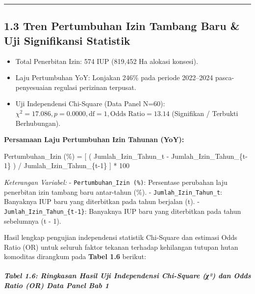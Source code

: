 \documentclass[
]{article}
\newenvironment{Shaded}{}{}
\newcommand{\NormalTok}[1]{#1}
\providecommand{\tightlist}{%
  \setlength{\itemsep}{0pt}\setlength{\parskip}{0pt}}
\begin{document}
\begin{center}\rule{0.5\linewidth}{0.5pt}\end{center}

\subsection{1.3 Tren Pertumbuhan Izin Tambang Baru \& Uji Signifikansi
Statistik}\label{tren-pertumbuhan-izin-tambang-baru-uji-signifikansi-statistik}

\begin{itemize}
\tightlist
\item
  Total Penerbitan Izin: 574 IUP (819,452 Ha alokasi konsesi).
\item
  Laju Pertumbuhan YoY: Lonjakan 246\% pada periode 2022--2024
  pasca-penyesuaian regulasi perizinan terpusat.
\item
  Uji Independensi Chi-Square (Data Panel N=60):
  \(\chi^2 = 17.086, p = 0.0000, \text{df} = 1, \text{Odds Ratio} = 13.14\)
  (Signifikan / Terbukti Berhubungan).
\end{itemize}

\textbf{Persamaan Laju Pertumbuhan Izin Tahunan (YoY):}

\begin{Shaded}
\begin{Highlighting}[]
\NormalTok{Pertumbuhan\_Izin (\%) = [ ( Jumlah\_Izin\_Tahun\_t {-} Jumlah\_Izin\_Tahun\_\{t{-}1\} ) / Jumlah\_Izin\_Tahun\_\{t{-}1\} ] * 100}
\end{Highlighting}
\end{Shaded}

\emph{Keterangan Variabel:} - \texttt{Pertumbuhan\_Izin\ (\%)}:
Persentase perubahan laju penerbitan izin tambang baru antar-tahun (\%).
- \texttt{Jumlah\_Izin\_Tahun\_t}: Banyaknya IUP baru yang diterbitkan
pada tahun berjalan (t). - \texttt{Jumlah\_Izin\_Tahun\_\{t-1\}}:
Banyaknya IUP baru yang diterbitkan pada tahun sebelumnya (t - 1).

Hasil lengkap pengujian independensi statistik Chi-Square dan estimasi
Odds Ratio (OR) untuk seluruh faktor tekanan terhadap kehilangan tutupan
hutan komoditas dirangkum pada \textbf{Tabel 1.6} berikut:

\subparagraph{Tabel 1.6: Ringkasan Hasil Uji Independensi Chi-Square
(χ²) dan Odds Ratio (OR) Data Panel Bab
1}\label{tabel-1.6-ringkasan-hasil-uji-independensi-chi-square-ux3c7uxb2-dan-odds-ratio-or-data-panel-bab-1}
\end{document}
